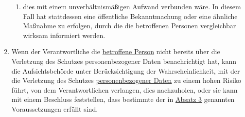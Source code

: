 \begin{enumerate}
\begin{enumerate}
    \item dies mit einem unverhältnismäßigen Aufwand verbunden wäre. In diesem Fall hat stattdessen eine öffentliche
     Bekanntmachung oder eine ähnliche Maßnahme zu erfolgen, durch die die \hyperref[itm:04-1]{betroffenen Personen} vergleichbar wirksam
     informiert werden.
    \label{itm:34-3c}

  \end{enumerate}

  \item Wenn der Verantwortliche die \hyperref[itm:04-1]{betroffene Person} nicht bereits über die Verletzung des Schutzes personenbezogener
   Daten benachrichtigt hat, kann die Aufsichtsbehörde unter Berücksichtigung der Wahrscheinlichkeit, mit der die
   Verletzung des Schutzes \hyperref[itm:04-1]{personenbezogener Daten} zu einem hohen Risiko führt, von dem Verantwortlichen verlangen,
   dies nachzuholen, oder sie kann mit einem Beschluss feststellen, dass bestimmte der in \hyperref[itm:34-3]{Absatz 3}
   genannten Voraussetzungen erfüllt sind.
  \label{itm:34-4}

\end{enumerate}


